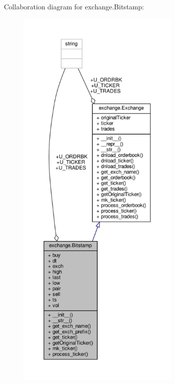 Collaboration diagram for exchange.\+Bitstamp\+:\nopagebreak
\begin{figure}[H]
\begin{center}
\leavevmode
\includegraphics[height=550pt]{classexchange_1_1_bitstamp__coll__graph}
\end{center}
\end{figure}
